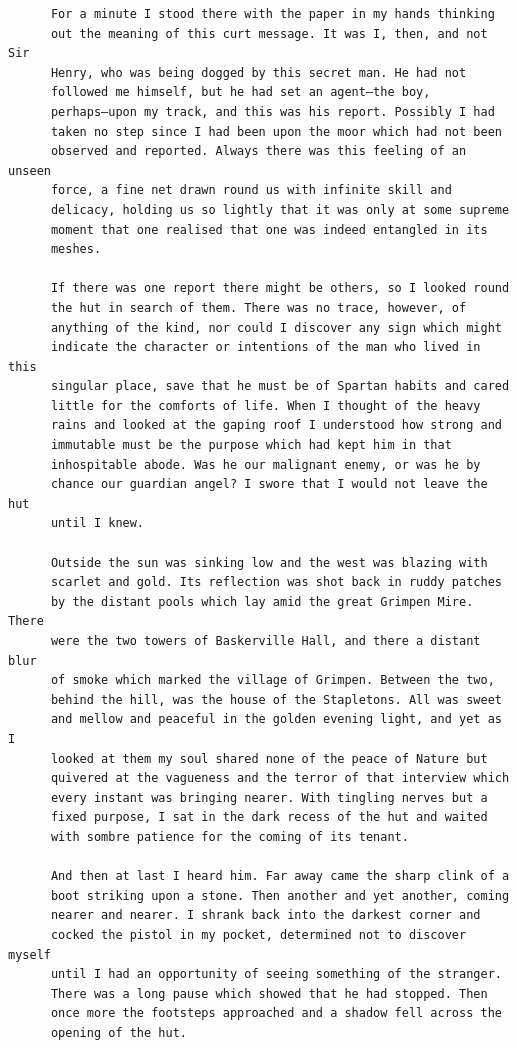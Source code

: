\documentclass{article}
\begin{document}
\begin{verbatim}
      For a minute I stood there with the paper in my hands thinking
      out the meaning of this curt message. It was I, then, and not Sir
      Henry, who was being dogged by this secret man. He had not
      followed me himself, but he had set an agent—the boy,
      perhaps—upon my track, and this was his report. Possibly I had
      taken no step since I had been upon the moor which had not been
      observed and reported. Always there was this feeling of an unseen
      force, a fine net drawn round us with infinite skill and
      delicacy, holding us so lightly that it was only at some supreme
      moment that one realised that one was indeed entangled in its
      meshes.

      If there was one report there might be others, so I looked round
      the hut in search of them. There was no trace, however, of
      anything of the kind, nor could I discover any sign which might
      indicate the character or intentions of the man who lived in this
      singular place, save that he must be of Spartan habits and cared
      little for the comforts of life. When I thought of the heavy
      rains and looked at the gaping roof I understood how strong and
      immutable must be the purpose which had kept him in that
      inhospitable abode. Was he our malignant enemy, or was he by
      chance our guardian angel? I swore that I would not leave the hut
      until I knew.

      Outside the sun was sinking low and the west was blazing with
      scarlet and gold. Its reflection was shot back in ruddy patches
      by the distant pools which lay amid the great Grimpen Mire. There
      were the two towers of Baskerville Hall, and there a distant blur
      of smoke which marked the village of Grimpen. Between the two,
      behind the hill, was the house of the Stapletons. All was sweet
      and mellow and peaceful in the golden evening light, and yet as I
      looked at them my soul shared none of the peace of Nature but
      quivered at the vagueness and the terror of that interview which
      every instant was bringing nearer. With tingling nerves but a
      fixed purpose, I sat in the dark recess of the hut and waited
      with sombre patience for the coming of its tenant.

      And then at last I heard him. Far away came the sharp clink of a
      boot striking upon a stone. Then another and yet another, coming
      nearer and nearer. I shrank back into the darkest corner and
      cocked the pistol in my pocket, determined not to discover myself
      until I had an opportunity of seeing something of the stranger.
      There was a long pause which showed that he had stopped. Then
      once more the footsteps approached and a shadow fell across the
      opening of the hut.


\end{verbatim}
\end{document}

